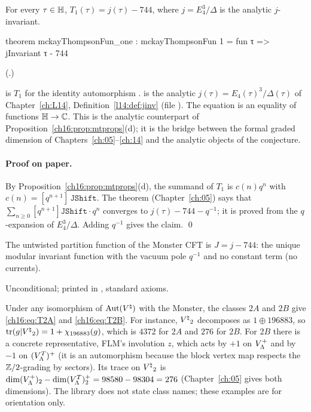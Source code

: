 \begin{theorem}[$T_1=J$]\label{ch16:thm:T1}
For every $\tau\in\mathbb{H}$, $T_1(\tau)=j(\tau)-744$, where $j=E_4^3/\Delta$ is the analytic $j$-invariant.
\end{theorem}
\begin{leancode}
theorem mckayThompsonFun_one :
    mckayThompsonFun 1 = fun τ => jInvariant τ - 744
\end{leancode}
(.)
\begin{dictionary}
 is $T_1$ for the identity automorphism .   is the
analytic $j(\tau)=E_4(\tau)^3/\Delta(\tau)$ of Chapter~\ref{ch:L14}, Definition~\ref{l14:def:jinv} (file
).  The equation is an equality of functions $\mathbb{H}\to{\mathbb{C}}$.
This is the analytic counterpart of Proposition~\ref{ch16:prop:mtprops}(d); it is the bridge between the formal
graded dimension of Chapters~\ref{ch:05}--\ref{ch:14} and the analytic objects of the conjecture.
\end{dictionary}
\paragraph{Proof on paper.}  By Proposition~\ref{ch16:prop:mtprops}(d), the summand of $T_1$ is $c(n)q^n$ with
$c(n)=[q^{n+1}]\,\mathtt{JShift}$.  The theorem  (Chapter~\ref{ch:05}) says that
$\sum_{n\ge0}[q^{n+1}]\mathtt{JShift}\cdot q^n$ converges to $j(\tau)-744-q^{-1}$; it is proved from the
$q$-expansion of $E_4^3/\Delta$.  Adding $q^{-1}$ gives the claim. \qed
\begin{physics}
The untwisted partition function of the Monster CFT is $J=j-744$: the unique modular invariant function with the
vacuum pole $q^{-1}$ and no constant term (no currents).
\end{physics}
\begin{status}
Unconditional; printed in , standard axioms.
\end{status}

\begin{example}\label{ch16:ex:T2}
Under any isomorphism of $\operatorname{Aut}({V^{\natural}})$ with the Monster, the classes $2A$ and $2B$ give \eqref{ch16:eq:T2A} and
\eqref{ch16:eq:T2B}.  For instance, ${V^{\natural}}_2$ decomposes as $1\oplus196883$, so $\operatorname{tr}(g|{V^{\natural}}_2)=1+\chi_{196883}(g)$,
which is $4372$ for $2A$ and $276$ for $2B$.  For $2B$ there is a concrete representative, FLM's involution $z$,
which acts by $+1$ on $V_{\Lambda}^+$ and by $-1$ on $(V_{\Lambda}^T)^+$ (it is an automorphism because the block vertex
map respects the ${\mathbb{Z}}/2$-grading by sectors).  Its trace on ${V^{\natural}}_2$ is
$\dim(V_{\Lambda}^+)_2-\dim(V_{\Lambda}^T)^+_2=98580-98304=276$ (Chapter~\ref{ch:05} gives both dimensions).  The library
does not state class names; these examples are for orientation only.
\end{example}


